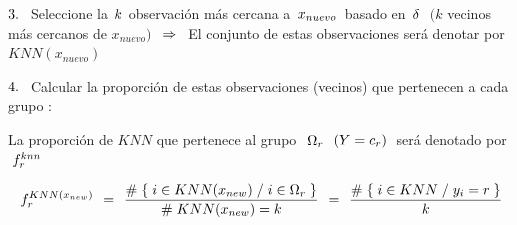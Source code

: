 \documentclass[
  11pt,
  a4paper,
]{article}
\begin{document}
\vspace{0.2cm}

\(3. \hspace{0.15cm}\) Seleccione la
\(\hspace{0.03 cm} k \hspace{0.03 cm}\) observación más cercana a
\(\hspace{0.06 cm} x_{nuevo}\hspace{0.06 cm}\) basado en
\(\hspace {0.05cm} \delta \hspace{0.12cm}\) \((k\) vecinos más cercanos
de \(x_{nuevo})\) \(\hspace{0.15cm} \Rightarrow \hspace{0.15cm}\) El
conjunto de estas observaciones será denotar por \(KNN(x_{nuevo})\)

\vspace{0.2cm}

\(4. \hspace{0.15cm}\) Calcular la proporción de estas observaciones
(vecinos) que pertenecen a cada grupo :

La proporción de \(KNN\) que pertenece al grupo
\(\hspace{0.15cm} \Omega_r\) \(\hspace{0.1cm}(Y=c_r) \hspace{0.1cm}\)
será denotado por \(\hspace{0.1 cm} f^{knn}_{r}\)

\[\hspace{0.1 cm} f^{KNN(x_{new})}_{r} \hspace{0.15cm}=\hspace{0.15cm} \dfrac{ \# \hspace{0.1cm}\lbrace\hspace{0.1cm} i \in KNN(x_{new}) \hspace{0.1cm}/\hspace{0.1cm} i \in \Omega_r \hspace{0.1cm}\rbrace  }{\# \hspace{0.1cm} KNN(x_{new}) = k} \hspace{0.15cm}=\hspace{0.15cm}  \dfrac{ \# \hspace{0.1cm}\lbrace\hspace{0.1cm} i \in KNN \hspace{0.1cm}/\hspace{0.1cm} y_i = r \hspace{0.1cm}\rbrace  }{ k}\]

\vspace{0.2cm}
\end{document}
